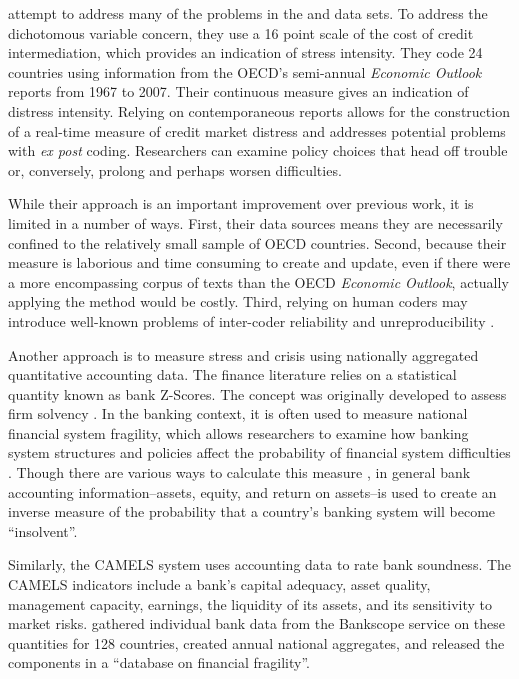 \documentclass[]{article}
\begin{document}
\cite{Romer2015} attempt to address many of the problems in the \cite{Reinhart2009} and \cite{laeven2013} data sets. To address the dichotomous variable concern, they use a 16 point scale of the cost of credit intermediation, which provides an indication of stress intensity. They code 24 countries using information from the OECD's semi-annual \emph{Economic Outlook} reports from 1967 to 2007. Their continuous measure gives an indication of distress intensity. Relying on contemporaneous reports allows for the construction of a real-time measure of credit market distress and addresses potential problems with \emph{ex post} coding. Researchers can examine policy choices that head off trouble or, conversely, prolong and perhaps worsen difficulties.

While their approach is an important improvement over previous work, it is limited in a number of ways. First, their data sources means they are necessarily confined to the relatively small sample of OECD countries. Second, because their measure is laborious and time consuming to create and update, even if there were a more encompassing corpus of texts than the OECD \emph{Economic Outlook}, actually applying the method would be costly. Third, relying on human coders may introduce well-known problems of inter-coder reliability and unreproducibility \citep{Minhas2015}.

Another approach is to measure stress and crisis using nationally aggregated quantitative accounting data. The finance literature relies on a statistical quantity known as bank Z-Scores. The concept was originally developed to assess firm solvency \citep[see][]{roy1952}. In the banking context, it is often used to measure national financial system fragility, which allows researchers to examine how banking system structures and policies affect the probability of financial system difficulties \citep[e.g.][]{beck2013bank,vcihak2010islamic,laeven2009bank,uhde2009}. Though there are various ways to calculate this measure \citep[73]{Lepetit2013}, in general bank accounting information--assets, equity, and return on assets--is used to create an inverse measure of the probability that a country's banking system will become ``insolvent''.

Similarly, the CAMELS system uses accounting data to rate bank soundness. The CAMELS indicators include a bank's capital adequacy, asset quality, management capacity, earnings, the liquidity of its assets, and its sensitivity to market risks. \cite{Andrianova2015} gathered individual bank data from the Bankscope service on these quantities for 128 countries, created annual national aggregates, and released the components in a ``database on financial fragility''.
\end{document}
